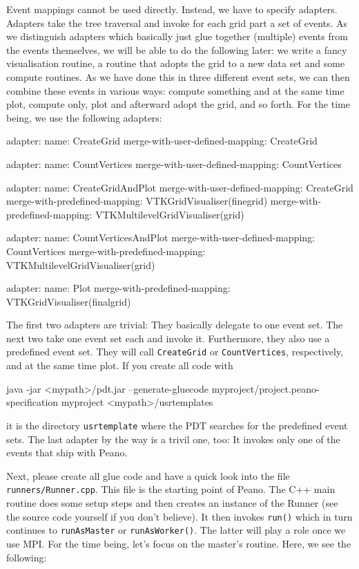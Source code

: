 \noindent
Event mappings cannot be used directly.
Instead, we have to specify adapters. 
Adapters take the tree traversal and invoke for each grid part a set of events. 
As we distinguish adapters which basically just glue together (multiple) events
from the events themselves, we will be able to do the following later:
we write a fancy visualisation routine, a routine that adopts the grid to a new
data set and some compute routines.
As we have done this in three different event sets, we can then combine these
events in various ways: compute something and at the same time plot, compute
only, plot and afterward adopt the grid, and so forth.
For the time being, we use the following adapters:

\begin{code}
adapter:
  name: CreateGrid
  merge-with-user-defined-mapping: CreateGrid

adapter:
  name: CountVertices
  merge-with-user-defined-mapping: CountVertices

adapter:
  name: CreateGridAndPlot
  merge-with-user-defined-mapping: CreateGrid
  merge-with-predefined-mapping: VTKGridVisualiser(finegrid)
  merge-with-predefined-mapping: VTKMultilevelGridVisualiser(grid)

adapter:
  name: CountVerticesAndPlot
  merge-with-user-defined-mapping: CountVertices
  merge-with-predefined-mapping: VTKMultilevelGridVisualiser(grid)

adapter:
  name: Plot
  merge-with-predefined-mapping: VTKGridVisualiser(finalgrid)
\end{code}

The first two adapters are trivial: 
They basically delegate to one event set. 
The next two take one event set each and invoke it. 
Furthermore, they also use a predefined event set. 
They will call \texttt{CreateGrid} or \texttt{CountVertices}, respectively, and
at the same time plot.
If you create all code with 

\begin{code}
java -jar <mypath>/pdt.jar --generate-gluecode
myproject/project.peano-specification myproject <mypath>/usrtemplates
\end{code}

\noindent
it is the directory \texttt{usrtemplate} where the PDT searches for the
predefined event sets.
The last adapter by the way is a trivil one, too: It invokes only one of the
events that ship with Peano.


Next, please create all glue code and have a quick look into the file
\texttt{runners/Runner.cpp}.
This file is the starting point of Peano.
The C++ main routine does some setup steps and then creates an instance of the
Runner (see the source code yourself if you don't believe).
It then invokes \texttt{run()} which in turn continues to \texttt{runAsMaster}
or \texttt{runAsWorker()}.
The latter will play a role once we use MPI.
For the time being, let's focus on the master's routine.
Here, we see the following:

